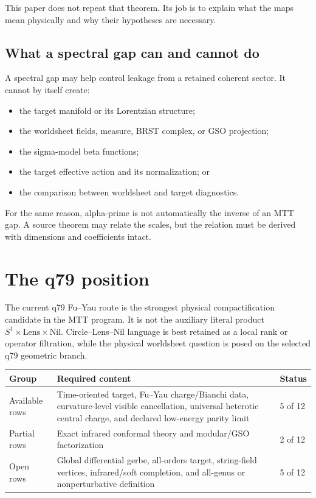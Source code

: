 \documentclass[11pt]{article}
\begin{document}
This paper does not repeat that theorem.  Its job is to explain what the maps
mean physically and why their hypotheses are necessary.

\subsection{What a spectral gap can and cannot do}

A spectral gap may help control leakage from a retained coherent sector.  It
cannot by itself create:
\begin{itemize}
\item the target manifold or its Lorentzian structure;
\item the worldsheet fields, measure, BRST complex, or GSO projection;
\item the sigma-model beta functions;
\item the target effective action and its normalization; or
\item the comparison between worldsheet and target diagnostics.
\end{itemize}
For the same reason, alpha-prime is not automatically the inverse of an MTT
gap.  A source theorem may relate the scales, but the relation must be
derived with dimensions and coefficients intact.

\section{The q79 position}

The current q79 Fu--Yau route is the strongest physical compactification
candidate in the MTT program.  It is not the auxiliary literal product
\(S^1\times\mathrm{Lens}\times\mathrm{Nil}\).  Circle--Lens--Nil language is
best retained as a local rank or operator filtration, while the physical
worldsheet question is posed on the selected q79 geometric branch.

\begin{center}
\small
\begin{tabularx}{\textwidth}{@{}L{0.23\textwidth}X L{0.18\textwidth}@{}}
\toprule
Group & Required content & Status\\
\midrule
Available rows & Time-oriented target, Fu--Yau charge/Bianchi data,
curvature-level visible cancellation, universal heterotic central charge,
and declared low-energy parity limit & 5 of 12\\
Partial rows & Exact infrared conformal theory and modular/GSO
factorization & 2 of 12\\
Open rows & Global differential gerbe, all-orders target, string-field
vertices, infrared/soft completion, and all-genus or nonperturbative
definition & 5 of 12\\
\bottomrule
\end{tabularx}
\end{center}
\end{document}
